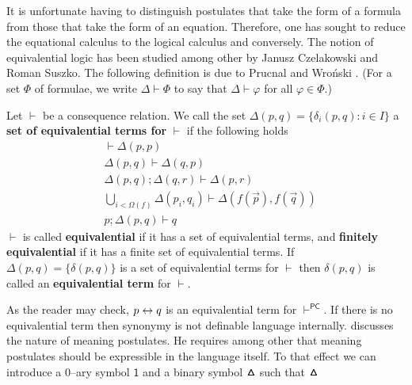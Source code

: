 It is unfortunate having to distinguish postulates that take the
form of a formula from those that take the form of an equation.
Therefore, one has sought to reduce the equational calculus to
the logical calculus and conversely. The notion of equivalential
logic has been studied among other by Janusz Czelakowski 
and Roman Suszko. The following definition is due to Prucnal and
Wro\'{n}ski . 
(For a set $\Phi$
of formulae, we write $\Delta \vdash \Phi$ to say that $\Delta
\vdash \varphi$ for all $\varphi \in \Phi$.)
\begin{defn}
\label{defn:equivalential}
Let $\vdash$ be a consequence relation. We call the set 
$\Delta(p,q) = \{\delta_i(p,q) : i \in I\}$ a \textbf{set of
equivalential terms for} $\vdash$ if the following holds
\begin{subequations}
\label{eq:eqterm}
\begin{align}
& \vdash \Delta(p,p) \\
& \Delta(p,q) \vdash \Delta(q,p) \\
& \Delta(p,q); \Delta(q,r) \vdash \Delta(p,r) \\
& \bigcup_{i < \Omega(f)} \Delta(p_i,q_i) \vdash
        \Delta(f(\vec{p}), f(\vec{q})) \\
& p; \Delta(p,q) \vdash q
\end{align}
\end{subequations}
$\vdash$ is called \textbf{equivalential} if it has a set of
equivalential terms, and \textbf{finitely equivalential} if it
has a finite set of equivalential terms. If $\Delta(p,q)
= \{\delta(p,q)\}$ is a set of equivalential terms for $\vdash$
then $\delta(p,q)$ is called an \textbf{equivalential term}
for $\vdash$.
\end{defn}
As the reader may check, $p \leftrightarrow q$ is an equivalential term for
$\vdash^{\mathsf{PC}}$. If there is no equivalential term then
synonymy is not definable language internally. \cite{zimmermann:meaning} 
discusses the nature of meaning postulates. He requires among other 
that meaning postulates should be expressible in the language itself. 
To that effect we can introduce a 0--ary symbol $\mathsf{1}$ and a binary 
symbol $\boldsymbol{\vartriangle}$ such that $\boldsymbol{\vartriangle}$ 
